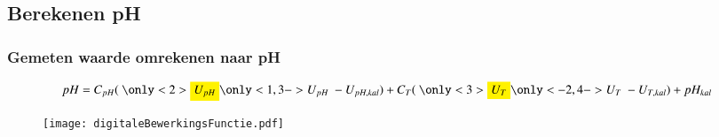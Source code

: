     \subsection*{Berekenen pH}
    \begin{frame}
        \frametitle{Gemeten waarde omrekenen naar pH}

        \begin{equation}\label{eq:digitaleBS}
            pH = C_{pH}(\
                \only<2>{\colorbox{yellow}{$U_{pH}$}}\only<1,3->{U_{pH}}\
            - U_{pH,kal}) + C_T(\
                \only<3>{\colorbox{yellow}{$U_T$}}\only<-2,4->{U_T}\
            - U_{T,kal}) + pH_{kal}\
        \end{equation}
        

        \pause[4]
        
        \begin{figure}
            \centering
            \texttt{[image: digitaleBewerkingsFunctie.pdf]}
        \end{figure}


    
    \end{frame}